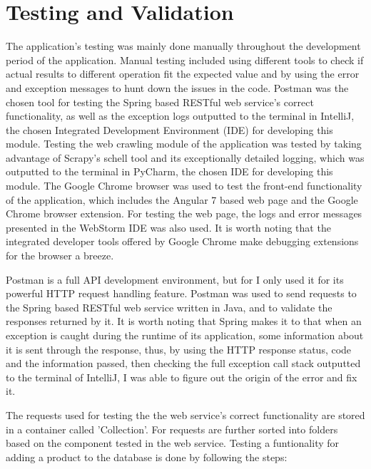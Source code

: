 \documentclass[12pt,a4paper,twoside]{report}
\begin{document}
\chapter{Testing and Validation}

The application's testing was mainly done manually throughout the development period of the application. Manual testing included using different tools to check if actual results to different operation fit the expected value and by using the error and exception messages to hunt down the issues in the code. Postman was the chosen tool for testing the Spring based RESTful web service's correct functionality, as well as the exception logs outputted to the terminal in IntelliJ, the chosen Integrated Development Environment (IDE) for developing this module. Testing the web crawling module of the application was tested by taking advantage of Scrapy's schell tool and its exceptionally detailed logging, which was outputted to the terminal in PyCharm, the chosen IDE for developing this module. The Google Chrome browser was used to test the front-end functionality of the application, which includes the Angular 7 based web page and the Google Chrome browser extension. For testing the web page, the logs and error messages presented in the WebStorm IDE was also used. It is worth noting that the integrated developer tools offered by Google Chrome make debugging extensions for the browser a breeze.

Postman is a full API development environment, but for I only used it for its powerful HTTP request handling feature. Postman was used to send requests to the Spring based RESTful web service written in Java, and to validate the responses returned by it. It is worth noting that Spring makes it to that when an exception is caught during the runtime of its application, some information about it is sent through the response, thus, by using the HTTP response status, code and the information passed, then checking the full exception call stack outputted to the terminal of IntelliJ, I was able to figure out the origin of the error and fix it.

The requests used for testing the the web service's correct functionality are stored in a container called 'Collection'. For requests are further sorted into folders based on the component tested in the web service. Testing a funtionality for adding a product to the database is done by following the steps:
\end{document}
